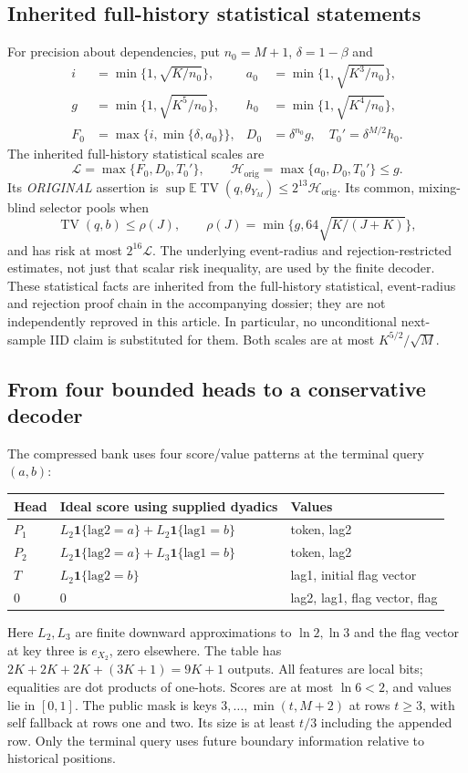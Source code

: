\documentclass[11pt,letterpaper]{article}
\theoremstyle{definition}\newtheorem{definition}[theorem]{Definition}
\theoremstyle{remark}\newtheorem{remark}[theorem]{Remark}
\newcommand{\TV}{\operatorname{TV}}
\newcommand{\E}{\mathbb{E}}
\newcommand{\ind}{\mathbf{1}}
\begin{document}
\subsection{Inherited full-history statistical statements}
For precision about dependencies, put $n_0=M+1$, $\delta=1-\beta$ and
\begin{align*}
 i&=\min\{1,\sqrt{K/n_0}\},& a_0&=\min\{1,\sqrt{K^3/n_0}\},\\
 g&=\min\{1,\sqrt{K^5/n_0}\},& h_0&=\min\{1,\sqrt{K^4/n_0}\},\\
 F_0&=\max\{i,\min\{\delta,a_0\}\},&
 D_0&=\delta^{n_0}g,\quad T_0'=\delta^{M/2}h_0.
\end{align*}
The inherited full-history statistical scales are
\begin{equation}\label{eq:inherited}
 \mathcal L=\max\{F_0,D_0,T_0'\},\qquad
 \mathcal H_{\mathrm{orig}}=\max\{a_0,D_0,T_0'\}\le g.
\end{equation}
Its \emph{ORIGINAL} assertion is $\sup\E\TV(q,\theta_{Y_M})\le2^{13}\mathcal H_{\mathrm{orig}}$. Its common, mixing-blind selector pools when
\[
 \TV(q,b)\le\rho(J),\qquad \rho(J)=\min\{g,64\sqrt{K/(J+K)}\},
\]
and has risk at most $2^{16}\mathcal L$. The underlying event-radius and rejection-restricted estimates, not just that scalar risk inequality, are used by the finite decoder. These statistical facts are inherited from the full-history statistical, event-radius and rejection proof chain in the accompanying dossier; they are not independently reproved in this article. In particular, no unconditional next-sample IID claim is substituted for them. Both scales are at most $K^{5/2}/\sqrt M$.

\subsection{From four bounded heads to a conservative decoder}
The compressed bank uses four score/value patterns at the terminal query $(a,b)$:
\begin{center}\small
\begin{tabular}{@{}lll@{}}\toprule
Head & Ideal score using supplied dyadics & Values\\\midrule
$P_1$ & $L_2\ind\{\mathrm{lag2}=a\}+L_2\ind\{\mathrm{lag1}=b\}$ & token, lag2\\
$P_2$ & $L_2\ind\{\mathrm{lag2}=a\}+L_3\ind\{\mathrm{lag1}=b\}$ & token, lag2\\
$T$ & $L_2\ind\{\mathrm{lag2}=b\}$ & lag1, initial flag vector\\
$0$ & $0$ & lag2, lag1, flag vector, flag\\\bottomrule
\end{tabular}
\end{center}
Here $L_2,L_3$ are finite downward approximations to $\ln2,\ln3$ and the flag vector at key three is $e_{X_2}$, zero elsewhere. The table has $2K+2K+2K+(3K+1)=9K+1$ outputs. All features are local bits; equalities are dot products of one-hots. Scores are at most $\ln6<2$, and values lie in $[0,1]$. The public mask is keys $3,\ldots,\min(t,M+2)$ at rows $t\ge3$, with self fallback at rows one and two. Its size is at least $t/3$ including the appended row. Only the terminal query uses future boundary information relative to historical positions.
\end{document}
